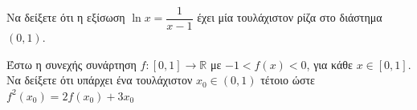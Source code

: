\documentclass{presentation}
\begin{document}
\begin{askisi}
    Να δείξετε ότι η εξίσωση $\ln x=\dfrac{1}{x-1}$ έχει μία τουλάχιστον ρίζα στο διάστημα $(0,1)$.

\end{askisi}

\begin{askisi}
    Έστω η συνεχής συνάρτηση $f:[0,1]\to\mathbb{R}$ με $-1<f(x)<0$, για κάθε $x\in [0,1]$. Να δείξετε ότι υπάρχει ένα τουλάχιστον $x_0\in (0,1)$ τέτοιο ώστε $f^2(x_0)=2f(x_0)+3x_0$

\end{askisi}
\end{document}
